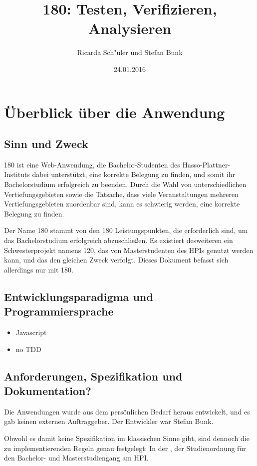 \documentclass[ngerman]{article}
\title{180: Testen, Verifizieren, Analysieren}
\author{Ricarda Sch"uler und Stefan Bunk}
\date{24.01.2016}
\begin{document}
\listoftodos
\tableofcontents

\section{Überblick über die Anwendung}
\label{sec:ueberblick}

\subsection{Sinn und Zweck}

180 ist eine Web-Anwendung, die Bachelor-Studenten des Hasso-Plattner-Instituts dabei unterstützt, eine korrekte Belegung zu finden, und somit ihr Bachelorstudium erfolgreich zu beenden.
Durch die Wahl von unterschiedlichen Vertiefungsgebieten sowie die Tatsache, dass viele Veranstaltungen mehreren Vertiefungsgebieten zuordenbar sind, kann es schwierig werden, eine korrekte Belegung zu finden.

Der Name 180 stammt von den 180 Leistungspunkten, die erforderlich sind, um das Bachelorstudium erfolgreich abzuschließen.
Es existiert desweiteren ein Schwesterprojekt namens 120, das von Masterstudenten des HPIs genutzt werden kann, und das den gleichen Zweck verfolgt.
Dieses Dokument befasst sich allerdings nur mit 180.

\subsection{Entwicklungsparadigma und Programmiersprache}

\begin{itemize}
    \item Javascript
    \item no TDD
\end{itemize}

\subsection{Anforderungen, Spezifikation und Dokumentation?}

Die Anwendungen wurde aus dem persönlichen Bedarf heraus entwickelt, und es gab keinen externen Auftraggeber.
Der Entwickler war Stefan Bunk.

Obwohl es damit keine Spezifikation im klassischen Sinne gibt, sind dennoch die zu implementierenden Regeln genau festgelegt:
In der , der Studienordnung für den Bachelor- und Masterstudiengang am HPI.
\end{document}
